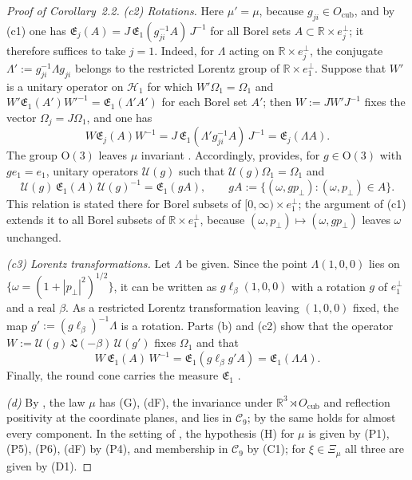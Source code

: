 \documentclass[11pt,letterpaper,reqno]{amsart}
\theoremstyle{definition}
\begin{document}
\begin{proof}[Proof of Corollary~2.2]
\emph{(c2) Rotations.}
Here $\mu'=\mu$, because $g_{ji}\in O_{\mathrm{cub}}$, and by (c1) one has $\mathfrak E_j(A)=J\,\mathfrak E_1(g_{ji}^{-1}A)\,J^{-1}$ for all Borel sets $A\subset\mathbb R\times e_j^\perp$; it therefore suffices to take $j=1$.
Indeed, for $\Lambda$ acting on $\mathbb R\times e_j^\perp$, the conjugate $\Lambda':=g_{ji}^{-1}\Lambda g_{ji}$ belongs to the restricted Lorentz group of $\mathbb R\times e_1^\perp$.
Suppose that $W'$ is a unitary operator on $\mathcal H_1$ for which $W'\Omega_1=\Omega_1$ and $W'\mathfrak E_1(A')W'^{-1}=\mathfrak E_1(\Lambda'A')$ for each Borel set $A'$; then $W:=JW'J^{-1}$ fixes the vector $\Omega_j=J\Omega_1$, and one has
\begin{equation*}
W\mathfrak E_j(A)W^{-1}=J\,\mathfrak E_1(\Lambda'g_{ji}^{-1}A)\,J^{-1}=\mathfrak E_j(\Lambda A).
\end{equation*}
The group $\mathrm O(3)$ leaves $\mu$ invariant \cite[Theorem~1.4, Part~I\,(a), (f)]{QEDII}.
Accordingly, \cite[Proposition~14.47\,(a)]{QEDII} provides, for $g\in\mathrm O(3)$ with $ge_1=e_1$, unitary operators $\mathcal U(g)$ such that $\mathcal U(g)\Omega_1=\Omega_1$ and
\begin{equation*}
\mathcal U(g)\,\mathfrak E_1(A)\,\mathcal U(g)^{-1}=\mathfrak E_1(gA),\qquad gA:=\{(\omega,gp_\perp):(\omega,p_\perp)\in A\}.
\end{equation*}
This relation is stated there for Borel subsets of $[0,\infty)\times e_1^\perp$; the argument of (c1) extends it to all Borel subsets of $\mathbb R\times e_1^\perp$, because $(\omega,p_\perp)\mapsto(\omega,gp_\perp)$ leaves $\omega$ unchanged.

\emph{(c3) Lorentz transformations.}
Let $\Lambda$ be given.
Since the point $\Lambda(1,0,0)$ lies on $\{\omega=(1+|p_\perp|^2)^{1/2}\}$, it can be written as $g\ell_\beta(1,0,0)$ with a rotation $g$ of $e_1^\perp$ and a real $\beta$.
As a restricted Lorentz transformation leaving $(1,0,0)$ fixed, the map $g':=(g\ell_\beta)^{-1}\Lambda$ is a rotation.
Parts (b) and (c2) show that the operator $W:=\mathcal U(g)\,\mathfrak L(-\beta)\,\mathcal U(g')$ fixes $\Omega_1$ and that
\begin{equation*}
W\,\mathfrak E_1(A)\,W^{-1}=\mathfrak E_1(g\ell_\beta g'A)=\mathfrak E_1(\Lambda A).
\end{equation*}
Finally, the round cone carries the measure $\mathfrak E_1$ \cite[Theorem~1.4, Part~I\,(c), (f)]{QEDII}.

\emph{(d)} By \cite[Theorem~1.3\,(a), (b)(i)]{QEDII}, the law $\mu$ has (G), (dF), the invariance under $\mathbb R^3\rtimes O_{\mathrm{cub}}$ and reflection positivity at the coordinate planes, and lies in $\mathcal C_9$; by \cite[Theorem~1.3\,(b)(v)]{QEDII} the same holds for almost every component.
In the setting of \cite[Theorem~44]{QEDIII}, the hypothesis (H) for $\mu$ is given by (P1), (P5), (P6), (dF) by (P4), and membership in $\mathcal C_9$ by (C1); for $\xi\in\Xi_\mu$ all three are given by (D1).
\end{proof}
\end{document}

